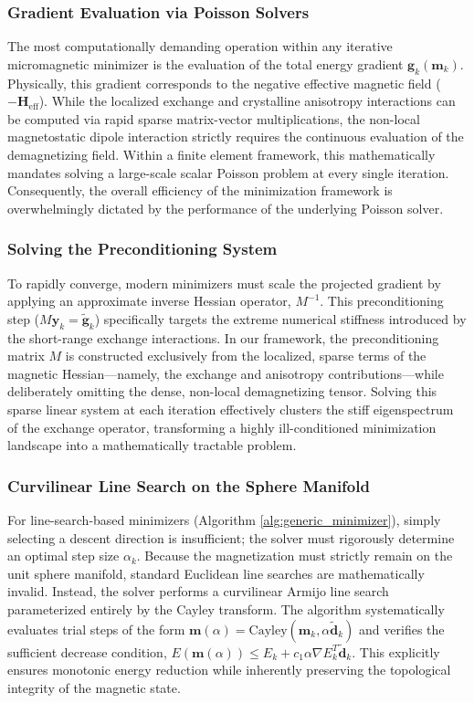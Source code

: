 \documentclass[10pt, a4paper, twocolumn]{article}
\begin{document}
\subsubsection{Gradient Evaluation via Poisson Solvers}
The most computationally demanding operation within any iterative micromagnetic minimizer is the evaluation of the total energy gradient $\mathbf{g}_k(\mathbf{m}_k)$. Physically, this gradient corresponds to the negative effective magnetic field ($-\mathbf{H}_{\mathrm{eff}}$). While the localized exchange and crystalline anisotropy interactions can be computed via rapid sparse matrix-vector multiplications, the non-local magnetostatic dipole interaction strictly requires the continuous evaluation of the demagnetizing field. Within a finite element framework, this mathematically mandates solving a large-scale scalar Poisson problem at every single iteration. Consequently, the overall efficiency of the minimization framework is overwhelmingly dictated by the performance of the underlying Poisson solver.

\subsubsection{Solving the Preconditioning System}
To rapidly converge, modern minimizers must scale the projected gradient by applying an approximate inverse Hessian operator, $M^{-1}$. This preconditioning step ($M \mathbf{y}_k = \tilde{\mathbf{g}}_k$) specifically targets the extreme numerical stiffness introduced by the short-range exchange interactions. In our framework, the preconditioning matrix $M$ is constructed exclusively from the localized, sparse terms of the magnetic Hessian—namely, the exchange and anisotropy contributions—while deliberately omitting the dense, non-local demagnetizing tensor. Solving this sparse linear system at each iteration effectively clusters the stiff eigenspectrum of the exchange operator, transforming a highly ill-conditioned minimization landscape into a mathematically tractable problem.

\subsubsection{Curvilinear Line Search on the Sphere Manifold}
For line-search-based minimizers (Algorithm \ref{alg:generic_minimizer}), simply selecting a descent direction is insufficient; the solver must rigorously determine an optimal step size $\alpha_k$. Because the magnetization must strictly remain on the unit sphere manifold, standard Euclidean line searches are mathematically invalid. Instead, the solver performs a curvilinear Armijo line search parameterized entirely by the Cayley transform. The algorithm systematically evaluates trial steps of the form $\mathbf{m}(\alpha) = \mathrm{Cayley}(\mathbf{m}_k, \alpha \tilde{\mathbf{d}}_k)$ and verifies the sufficient decrease condition, $E(\mathbf{m}(\alpha)) \le E_k + c_1 \alpha \nabla E_k^T \tilde{\mathbf{d}}_k$. This explicitly ensures monotonic energy reduction while inherently preserving the topological integrity of the magnetic state.
\end{document}
